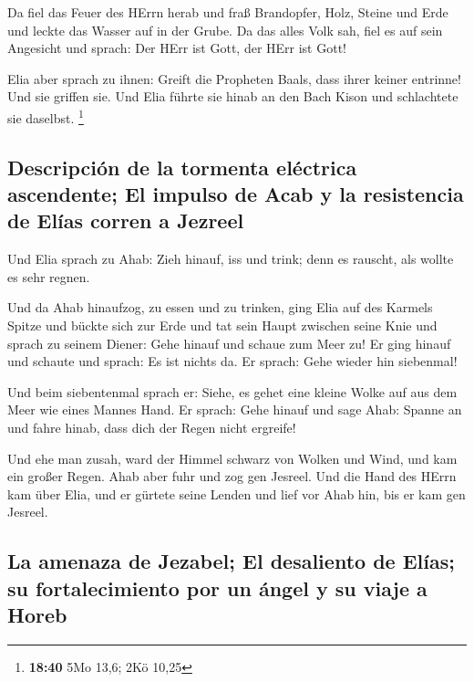  Da fiel das Feuer des HErrn herab und fraß Brandopfer,
Holz, Steine und Erde und leckte das Wasser auf in der Grube.
 Da das alles Volk sah, fiel es auf sein Angesicht und
sprach: Der HErr ist Gott, der HErr ist Gott!

 Elia aber sprach zu ihnen: Greift die Propheten Baals,
dass ihrer keiner entrinne! Und sie griffen sie. Und Elia führte sie
hinab an den Bach Kison und schlachtete sie daselbst. \footnote{\textbf{18:40}
  5Mo 13,6; 2Kö 10,25}

\hypertarget{descripciuxf3n-de-la-tormenta-eluxe9ctrica-ascendente-el-impulso-de-acab-y-la-resistencia-de-eluxedas-corren-a-jezreel}{%
\subsection{Descripción de la tormenta eléctrica ascendente; El impulso
de Acab y la resistencia de Elías corren a
Jezreel}\label{descripciuxf3n-de-la-tormenta-eluxe9ctrica-ascendente-el-impulso-de-acab-y-la-resistencia-de-eluxedas-corren-a-jezreel}}

 Und Elia sprach zu Ahab: Zieh hinauf, iss und trink;
denn es rauscht, als wollte es sehr regnen.

 Und da Ahab hinaufzog, zu essen und zu trinken, ging
Elia auf des Karmels Spitze und bückte sich zur Erde und tat sein Haupt
zwischen seine Knie  und sprach zu seinem Diener: Gehe
hinauf und schaue zum Meer zu! Er ging hinauf und schaute und sprach: Es
ist nichts da. Er sprach: Gehe wieder hin siebenmal!

 Und beim siebentenmal sprach er: Siehe, es gehet eine
kleine Wolke auf aus dem Meer wie eines Mannes Hand. Er sprach: Gehe
hinauf und sage Ahab: Spanne an und fahre hinab, dass dich der Regen
nicht ergreife!

 Und ehe man zusah, ward der Himmel schwarz von Wolken
und Wind, und kam ein großer Regen. Ahab aber fuhr und zog gen Jesreel.
 Und die Hand des HErrn kam über Elia, und er gürtete
seine Lenden und lief vor Ahab hin, bis er kam gen Jesreel.

\hypertarget{la-amenaza-de-jezabel-el-desaliento-de-eluxedas-su-fortalecimiento-por-un-uxe1ngel-y-su-viaje-a-horeb}{%
\subsection{La amenaza de Jezabel; El desaliento de Elías; su
fortalecimiento por un ángel y su viaje a
Horeb}\label{la-amenaza-de-jezabel-el-desaliento-de-eluxedas-su-fortalecimiento-por-un-uxe1ngel-y-su-viaje-a-horeb}}

